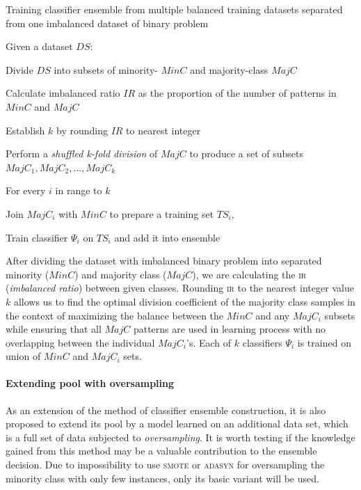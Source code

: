 \documentclass[pmlr]{jmlr}
\begin{document}
\begin{algorithm}[!h]
\caption{Training classifier ensemble from multiple balanced training datasets separated from one imbalanced dataset of binary problem}\label{alg:moore}
Given a dataset $DS$:
\begin{enumerate*}
	\item Divide $DS$ into subsets of minority- $MinC$ and majority-class $MajC$
	\item Calculate imbalanced ratio $IR$ as the proportion of the number of patterns in $MinC$ and $MajC$ 
	\item Establish $k$ by rounding $IR$ to nearest integer
	\item Perform a \emph{shuffled k-fold division} of $MajC$ to produce a set of subsets $MajC_1, MajC_2, \ldots, MajC_k$ 
	\item For every $i$ in range to $k$
	\begin{enumerate*}
		\item Join $MajC_i$ with $MinC$ to prepare a training set $TS_i$,
		\item Train classifier $\Psi_i$ on $TS_i$ and add it into ensemble
	\end{enumerate*}
\end{enumerate*}
\end{algorithm}

After dividing the dataset with imbalanced binary problem into separated minority ($MinC$) and majority class ($MajC$), we are calculating the \textsc{ir} (\emph{imbalanced ratio}) between given classes. Rounding \textsc{ir} to the nearest integer value $k$ allows us to find the optimal division coefficient of the majority class samples in the context of maximizing the balance between the $MinC$ and any $MajC_i$ subsets while ensuring that all $MajC$ patterns are used in learning process with no overlapping between the individual $MajC_i$'s. Each of $k$ classifiers $\Psi_i$ is trained on union of $MinC$ and $MajC_i$ sets.

\paragraph{Extending pool with oversampling} As an extension of the method of classifier ensemble construction, it is also proposed to extend its pool by a model learned on an additional data set, which is a full set of data subjected to \emph{oversampling}. It is worth testing if the knowledge gained from this method may be a valuable contribution to the ensemble decision. Due to impossibility to use \textsc{smote} or \textsc{adasyn} for oversampling the minority class with only few instances, only its basic variant will be used. 
\end{document}
